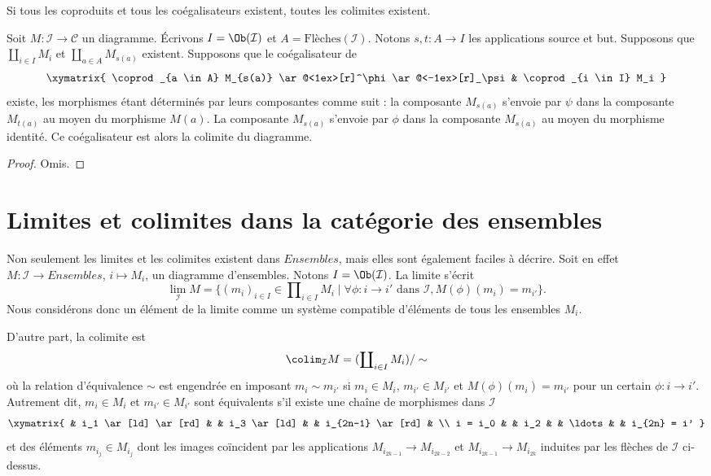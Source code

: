 \begin{lemma}
\label{lemma-colimits-coproducts-coequalizers}
\begin{slogan}
Si tous les coproduits et tous les coégalisateurs existent, toutes les
colimites existent.
\end{slogan}
Soit $M : \mathcal{I} \to \mathcal{C}$ un diagramme.
Écrivons $I = \Ob(\mathcal{I})$ et $A = \text{Flèches}(\mathcal{I})$.
Notons $s, t : A \to I$ les applications source et but.
Supposons que $\coprod_{i \in I} M_i$ et
$\coprod_{a \in A} M_{s(a)}$ existent. Supposons que le coégalisateur de
$$
\xymatrix{
\coprod_{a \in A} M_{s(a)}
\ar@<1ex>[r]^\phi \ar@<-1ex>[r]_\psi
&
\coprod_{i \in I} M_i
}
$$
existe, les morphismes étant déterminés par leurs composantes
comme suit : la composante $M_{s(a)}$ s'envoie par $\psi$
dans la composante $M_{t(a)}$ au moyen du morphisme $M(a)$.
La composante $M_{s(a)}$ s'envoie par $\phi$ dans la composante
$M_{s(a)}$ au moyen du morphisme identité. Ce coégalisateur est alors la
colimite du diagramme.
\end{lemma}

\begin{proof}
Omis.
\end{proof}








\section{Limites et colimites dans la catégorie des ensembles}
\label{section-limit-sets}

\noindent
Non seulement les limites et les colimites existent dans $\textit{Ensembles}$,
mais elles sont également faciles à décrire. Soit en effet
$M : \mathcal{I}
\to \textit{Ensembles}$, $i \mapsto M_i$, un diagramme
d'ensembles. Notons $I = \Ob(\mathcal{I})$.
La limite s'écrit
$$
\lim_\mathcal{I} M
=
\{
(m_i)_{i\in I} \in \prod\nolimits_{i\in I} M_i
\mid
\forall \phi : i \to i' \text{ dans }\mathcal{I},
M(\phi)(m_i) = m_{i'}
\}.
$$
Nous considérons donc un élément de la limite comme un système compatible
d'éléments de tous les ensembles $M_i$.

\medskip\noindent
D'autre part, la colimite est
$$
\colim_\mathcal{I} M
=
(\coprod\nolimits_{i\in I} M_i)/\sim
$$
où la relation d'équivalence $\sim$ est engendrée en imposant
$m_i \sim m_{i'}$ si $m_i \in M_i$,
$m_{i'} \in M_{i'}$ et $M(\phi)(m_i) = m_{i'}$ pour un certain
$\phi : i \to i'$. Autrement dit, $m_i \in M_i$
et $m_{i'} \in M_{i'}$ sont équivalents s'il existe une
chaîne de morphismes dans $\mathcal{I}$
$$
\xymatrix{
&
i_1 \ar[ld] \ar[rd] & &
i_3 \ar[ld] & &
i_{2n-1} \ar[rd] & \\
i = i_0 & &
i_2 & &
\ldots & &
i_{2n} = i'
}
$$
et des éléments $m_{i_j} \in M_{i_j}$ dont les images coïncident par
les applications $M_{i_{2k-1}} \to M_{i_{2k-2}}$ et
$M_{i_{2k-1}}
\to M_{i_{2k}}$ induites par les flèches de
$\mathcal{I}$ ci-dessus.

